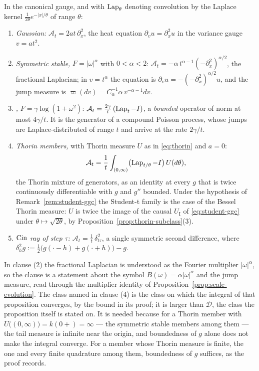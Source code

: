 \begin{proposition}\label{prop:corner-generators}
In the canonical gauge, and with $\operatorname{Lap}_\theta$ denoting convolution by the Laplace kernel
$\tfrac{1}{2\theta}e^{-|x|/\theta}$ of range $\theta$:
\begin{enumerate}
\item \emph{Gaussian:} $\mathcal{A}_t = 2at\,\partial_x^2$, the heat equation
$\partial_v u = \partial_x^2u$ in the variance gauge $v = at^2$.
\item \emph{Symmetric stable,} $F = |\omega|^\alpha$ with $0 < \alpha < 2$:
$\mathcal{A}_t = -\alpha\,t^{\alpha-1}(-\partial_x^2)^{\alpha/2}$, the fractional Laplacian;
in $v = t^\alpha$ the equation is $\partial_v u = -(-\partial_x^2)^{\alpha/2}u$, and the jump
measure is $\varpi(dv) = C_\alpha^{-1}\alpha\,v^{-\alpha-1}dv$.
\item \emph{\Matern{},} $F = \gamma\log(1+\omega^2)$:
$\mathcal{A}_t = \tfrac{2\gamma}{t}\,(\operatorname{Lap}_t - I)$, a \emph{bounded} operator of norm at most
$4\gamma/t$. It is the generator of a compound Poisson process, whose jumps are
Laplace-distributed of range $t$ and arrive at the rate $2\gamma/t$.
\item \emph{Thorin members,} with Thorin measure $U$ as in \ref{eq:thorin} and $a = 0$:
\[
  \mathcal{A}_t = \frac1t\int_{(0,\infty)}\bigl(\operatorname{Lap}_{t/\theta} - I\bigr)\,U(d\theta),
\]
the Thorin mixture of \Matern{} generators, as an identity at every $g$ that is twice continuously
differentiable with $g$ and $g''$ bounded. Under the hypothesis of Remark~\ref{rem:student-ggc}
the Student-t family is the case of the Bessel Thorin measure: $U$ is twice the image of the
causal $U_{\mathrm I}$ of \ref{eq:student-ggc} under $\theta \mapsto \sqrt{2\theta}$, by
Proposition~\ref{prop:thorin-subclass}(3).
\item \emph{$\operatorname{Cin}$ ray of step $\tau$:} $\mathcal{A}_t = \tfrac1t\,\delta^2_{t\tau}$, a single
symmetric second difference, where
$\delta^2_h g := \tfrac12\bigl(g(\cdot - h) + g(\cdot + h)\bigr) - g$.
\end{enumerate}
\end{proposition}

In clause (2) the fractional Laplacian is understood as the Fourier multiplier
$|\omega|^\alpha$, so the clause is a statement about the symbol
$B(\omega) = \alpha|\omega|^\alpha$ and the jump measure, read through the multiplier identity
of Proposition~\ref{prop:scale-evolution}. The class named in clause (4) is the class on which
the integral of that proposition converges, by the bound in its proof; it is larger than
$\mathcal{D}$, the class the proposition itself is stated on. It is needed because for a Thorin
member with $U\bigl((0,\infty)\bigr) = k(0{+}) = \infty$ --- the symmetric stable members among
them --- the tail measure is infinite near the origin, and boundedness of $g$ alone does not make
the integral converge. For a member whose Thorin measure is finite, the \Matern{} one and every
finite quadrature among them, boundedness of $g$ suffices, as the proof records.

